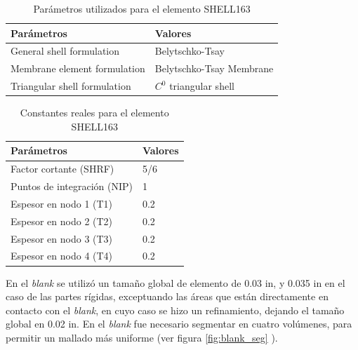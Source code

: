 \begin{table}[h]
\centering
\caption{Parámetros utilizados para el elemento SHELL163}
\label{}
\begin{tabular}{p{6cm} p{6cm}} \hline
Parámetros & Valores \\
\hline
General shell formulation & Belytschko-Tsay \\
Membrane element formulation & Belytschko-Tsay Membrane \\
Triangular shell formulation & $C^0$ triangular shell \\
\hline
\end{tabular}
\label{tab:shell_param}
\end{table}


\begin{table}[h]
\centering
\caption{Constantes reales para el elemento SHELL163}
\label{}
\begin{tabular}{p{6cm} p{3cm}} \hline
Parámetros & Valores \\
\hline
Factor cortante (SHRF) & 5/6 \\
Puntos de integración (NIP) & 1 \\
Espesor en nodo 1 (T1) & 0.2 \\
Espesor en nodo 2 (T2) & 0.2 \\
Espesor en nodo 3 (T3) & 0.2 \\
Espesor en nodo 4 (T4) & 0.2 \\
\hline
\end{tabular}
\label{tab:shell_param}
\end{table}


En el \textit{blank} se utilizó un tamaño global de elemento de 0.03 in, y 0.035 in en el caso de las partes 
rígidas, exceptuando las áreas que están directamente en contacto con el \textit{blank}, en cuyo caso se hizo 
un refinamiento, dejando el tamaño global en 0.02 in. En el \textit{blank} fue necesario segmentar en cuatro 
volúmenes, para permitir un mallado más uniforme (ver figura \ref{fig:blank_seg} ).


